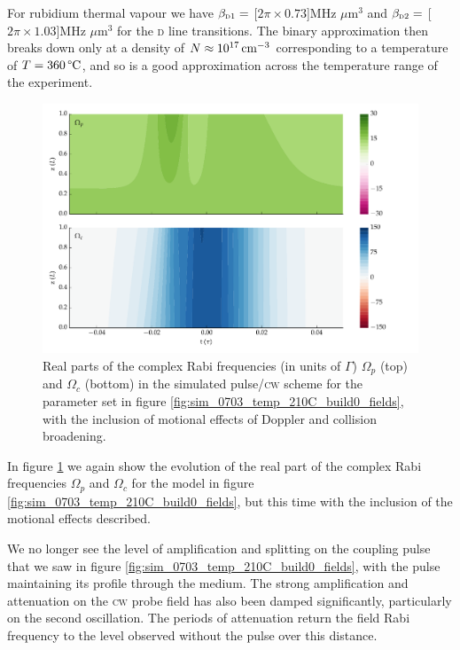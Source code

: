     For rubidium thermal vapour we have $\beta_{\textsc{d1}} = $
    \unit[$2\pi\times0.73$]{MHz $\mu$m$^3$}  and $\beta_{\textsc{d2}} = $
    \unit[$2\pi\times1.03$]{MHz $\mu$m$^3$} for the \textsc{d} line
    transitions.\cite{Weller2011} The binary approximation then breaks down only
    at a density of $N \approx \unit[10^{17}]{cm^{-3}}$ corresponding to a
    temperature of $T = \unit[360]{\textrm{\textdegree C}}$, and so is a good
    approximation across the temperature range of the experiment.

    \begin{figure}[h]
      \includegraphics[width=\linewidth]{figs/06_simultons/mb_vee2g_build1_15c_130p_0330t_230C_sb50_120vel000_00_002um_fig2.pdf}
      \caption{
      Real parts of the complex Rabi frequencies (in units of $\Gamma$)
      $\Omega_{p}$ (top) and  $\Omega_{c}$ (bottom) in the simulated
      pulse/\textsc{cw} scheme for the parameter set in figure
      \ref{fig:sim_0703_temp_210C_build0_fields}, with the inclusion of motional
      effects of Doppler and collision broadening.
      }
      \label{fig:sim_0703_temp_210C_build2_fields}
    \end{figure}

    In figure \ref{fig:sim_0703_temp_210C_build2_fields} we again show the
    evolution of the real part of the complex Rabi frequencies $\Omega_p$ and
    $\Omega_c$ for the model in figure
    \ref{fig:sim_0703_temp_210C_build0_fields}, but this time with the inclusion
    of the motional effects described. 

    We no longer see the level of amplification and splitting on the coupling
    pulse that we saw in figure \ref{fig:sim_0703_temp_210C_build0_fields}, with
    the pulse maintaining its profile through the medium. The strong
    amplification and attenuation on the \textsc{cw} probe field has also been
    damped significantly, particularly on the second oscillation. The periods of
    attenuation return the field Rabi frequency to the level observed without
    the pulse over this distance.

